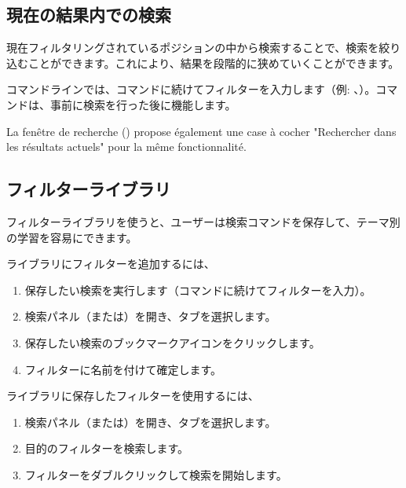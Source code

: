 \documentclass[letterpaper,10pt,dvipdfmx]{sphinxmanual}
\begin{document}
\subsection{現在の結果内での検索}
\label{\detokenize{annexe_filtres:recherche-dans-les-resultats-courants}}
\sphinxAtStartPar
現在フィルタリングされているポジションの中から検索することで、検索を絞り込むことができます。これにより、結果を段階的に狭めていくことができます。

\sphinxAtStartPar
コマンドラインでは、コマンドに続けてフィルターを入力します（例: 、）。コマンドは、事前に検索を行った後に機能します。

\sphinxAtStartPar
La fenêtre de recherche () propose également une case à cocher
"Rechercher dans les résultats actuels" pour la même fonctionnalité.


\subsection{フィルターライブラリ}
\label{\detokenize{annexe_filtres:bibliotheque-de-filtres}}
\sphinxAtStartPar
フィルターライブラリを使うと、ユーザーは検索コマンドを保存して、テーマ別の学習を容易にできます。

\sphinxAtStartPar
ライブラリにフィルターを追加するには、
\begin{enumerate}
%
\item {} 
\sphinxAtStartPar
保存したい検索を実行します（コマンドに続けてフィルターを入力）。

\item {} 
\sphinxAtStartPar
検索パネル（または）を開き、タブを選択します。

\item {} 
\sphinxAtStartPar
保存したい検索のブックマークアイコンをクリックします。

\item {} 
\sphinxAtStartPar
フィルターに名前を付けて確定します。

\end{enumerate}

\sphinxAtStartPar
ライブラリに保存したフィルターを使用するには、
\begin{enumerate}
%
\item {} 
\sphinxAtStartPar
検索パネル（または）を開き、タブを選択します。

\item {} 
\sphinxAtStartPar
目的のフィルターを検索します。

\item {} 
\sphinxAtStartPar
フィルターをダブルクリックして検索を開始します。

\end{enumerate}
\end{document}

